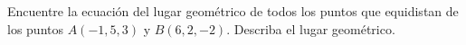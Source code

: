 \item Encuentre la ecuación del lugar geométrico de todos los puntos que equidistan de los puntos $A(-1, 5, 3)$ y $B(6, 2, -2)$. Describa el lugar geométrico.
